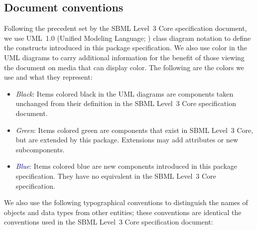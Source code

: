 \subsection{Document conventions}
\label{conventions}

Following the precedent set by the SBML Level~3 Core specification
document, we use UML~1.0 (Unified Modeling Language;
\cite{eriksson:1998,oestereich:1999}) class diagram notation to define
the constructs introduced in this package specification.  We also use
color in the UML diagrams to carry additional information for the
benefit of those viewing the document on media that can display color.
The following are the colors we use and what they represent:

\begin{itemize}

\item[\raisebox{2.75pt}{\colorbox{black}{\rule{0.8pt}{0.8pt}}}]
  \emph{Black}: Items colored black in the UML diagrams are components
  taken unchanged from their definition in the SBML Level~3 Core
  specification document.

\item[\raisebox{2.75pt}{\colorbox{mediumgreen}{\rule{0.8pt}{0.8pt}}}]
  \emph{\textcolor{mediumgreen}{Green}}: Items colored green are
  components that exist in SBML Level~3 Core, but are extended by this
  package.  Extensions may add attributes or new subcomponents.

\item[\raisebox{2.75pt}{\colorbox{darkblue}{\rule{0.8pt}{0.8pt}}}]
  \emph{\textcolor{darkblue}{Blue}}: Items colored blue are new
  components introduced in this package specification.  They have no
  equivalent in the SBML Level~3 Core specification.

\end{itemize}

We also use the following typographical conventions to distinguish the
names of objects and data types from other entities; these conventions
are identical the conventions used in the SBML Level~3 Core specification
document:

